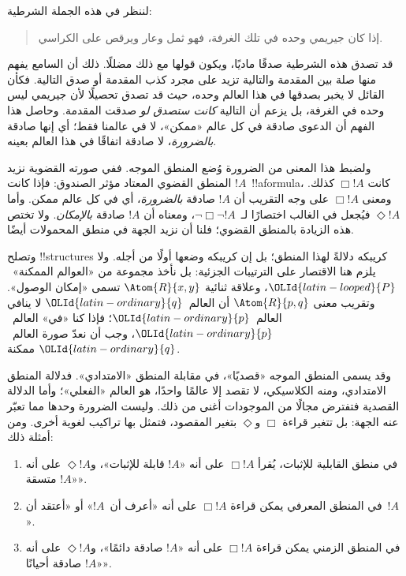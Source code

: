 \documentclass[../../../include/open-logic-section]{subfiles}
\begin{document}


لننظر في هذه الجملة الشرطية:
\begin{quote}
  إذا كان جيريمي وحده في تلك الغرفة، فهو ثمل وعار ويرقص على الكراسي.
\end{quote}
قد تصدق هذه الشرطية صدقًا ماديًا، ويكون قولها مع ذلك مضللًا.
ذلك أن السامع يفهم منها صلة بين المقدمة والتالية تزيد على مجرد
كذب المقدمة أو صدق التالية. فكأن القائل لا يخبر بصدقها في هذا
العالم وحده، حيث قد تصدق تحصيلًا لأن جيريمي ليس وحده في الغرفة،
بل يزعم أن التالية \emph{كانت ستصدق لو} صدقت المقدمة. وحاصل هذا
الفهم أن الدعوى صادقة في كل عالم «ممكن»، لا في عالمنا فقط؛ أي
إنها صادقة \emph{بالضرورة}، لا صادقة اتفاقًا في هذا العالم بعينه.

ولضبط هذا المعنى من الضرورة وُضع المنطق الموجه. ففي صورته القضوية
نزيد المنطق القضوي المعتاد مؤثر الصندوق: فإذا كانت $!A$~!!a{formula}،
كانت $\Box !A$ كذلك. ومعنى $\Box !A$ على وجه التقريب أن
$!A$ صادقة \emph{بالضرورة}، أي في كل عالم ممكن. وأما
$\Diamond !A$ فيُجعل في الغالب اختصارًا لـ~$\lnot \Box \lnot !A$،
ومعناه أن $!A$ صادقة \emph{بالإمكان}. ولا تختص هذه الزيادة
بالمنطق القضوي؛ فلنا أن نزيد الجهة في منطق المحمولات أيضًا.

وتصلح !!{structure}s كريبكه دلالةً لهذا المنطق؛ بل إن كريبكه
وضعها أولًا من أجله. ولا يلزم هنا الاقتصار على الترتيبات الجزئية:
بل نأخذ مجموعة من «العوالم الممكنة»~${\OLId{latin-looped}{P}}$، وعلاقة ثنائية
$\Atom{R}{x,y}$ تسمى «إمكان الوصول». وتقريب معنى $\Atom{R}{p,q}$
أن العالم~${\OLId{latin-ordinary}{q}}$ لا ينافي العالم~${\OLId{latin-ordinary}{p}}$؛ فإذا كنا «في» العالم~${\OLId{latin-ordinary}{p}}$،
وجب أن نعدّ صورة العالم~${\OLId{latin-ordinary}{q}}$ ممكنة.

وقد يسمى المنطق الموجه «قصديًا»، في مقابلة المنطق «الامتدادي».
فدلالة المنطق الامتدادي، ومنه الكلاسيكي، لا تقصد إلا عالمًا واحدًا،
هو العالم «الفعلي»؛ وأما الدلالة القصدية فتفترض مجالًا من
الموجودات أغنى من ذلك. وليست الضرورة وحدها مما تعبّر عنه الجهة:
بل تتغير قراءة $\Box$ و$\Diamond$ بتغير المقصود، فتمثل بها
تراكيب لغوية أخرى. ومن أمثلة ذلك:
\begin{enumerate}
\item في منطق القابلية للإثبات، يُقرأ $\Box !A$ على أنه «$!A$ قابلة
  للإثبات»، و$\Diamond !A$ على أنه «$!A$ متسقة».
\item في المنطق المعرفي يمكن قراءة $\Box !A$ على أنه «أعرف أن~$!A$»
  أو «أعتقد أن~$!A$».
\item في المنطق الزمني يمكن قراءة $\Box !A$ على أنه «$!A$ صادقة
  دائمًا»، و$\Diamond !A$ على أنه «$!A$ صادقة أحيانًا».
\end{enumerate}
\end{document}
